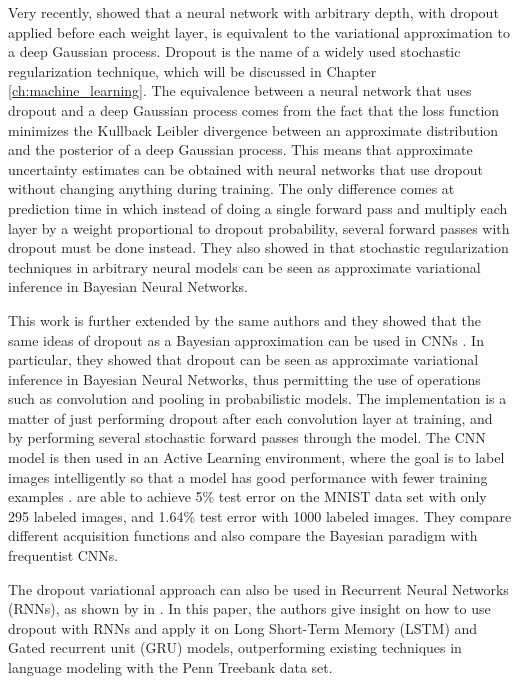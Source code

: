 Very recently, \citeauthor{gal2015dropout1} \cite{gal2015dropout1} showed that a neural network with arbitrary depth, with dropout applied before each weight layer, is equivalent to the variational approximation to a deep Gaussian process. Dropout is the name of a widely used stochastic regularization technique, which will be discussed in Chapter \ref{ch:machine_learning}. The equivalence between a neural network that uses dropout and a deep Gaussian process comes from the fact that the loss function minimizes the Kullback Leibler divergence between an approximate distribution and the posterior of a deep Gaussian process. This means that approximate uncertainty estimates can be obtained with neural networks that use dropout without changing anything during training. The only difference comes at prediction time in which instead of doing a single forward pass and multiply each layer by a weight proportional to dropout probability, several forward passes with dropout must be done instead. They also showed in \cite{gal2015modern} that stochastic regularization techniques in arbitrary neural models can be seen as approximate variational inference in Bayesian Neural Networks.

This work is further extended by the same authors and they showed that the same ideas of dropout as a Bayesian approximation can be used in CNNs \cite{gal2015bayesian}. In particular, they showed that dropout can be seen as approximate variational inference in Bayesian Neural Networks, thus permitting the use of operations such as convolution and pooling in probabilistic models. The implementation is a matter of just performing dropout after each convolution layer at training, and by performing several stochastic forward passes through the model. The CNN model is then used in an Active Learning environment, where the goal is to label images intelligently so that a model has good performance with fewer training examples \cite{Gal2016Active}. \citeauthor{Gal2016Active} \cite{Gal2016Active} are able to achieve 5\% test error on the MNIST data set \cite{lecun1998gradient} with only 295 labeled images, and 1.64\% test error with 1000 labeled images. They compare different acquisition functions and also compare the Bayesian paradigm with frequentist CNNs.

The dropout variational approach can also be used in Recurrent Neural Networks (RNNs), as shown by \citeauthor{gal2016theoretically} in \cite{gal2016theoretically}. In this paper, the authors give insight on how to use dropout with RNNs and apply it on Long Short-Term Memory (LSTM) and Gated recurrent unit (GRU) models, outperforming existing techniques in language modeling with the Penn Treebank data set.

